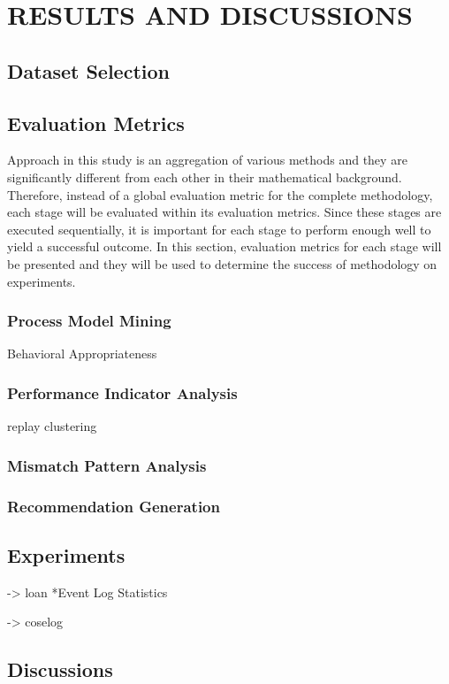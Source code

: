 \chapter{RESULTS AND DISCUSSIONS}
\label{chp:results-and-discussions}
 

\section{Dataset Selection}
\label{sec:dataset-selection}
 

\section{Evaluation Metrics}
\label{sec:evaluation-metrics}
Approach in this study is an aggregation of various methods and they are significantly different from each other in their mathematical background. Therefore, instead of a global evaluation metric for the complete methodology, each stage will be evaluated within its evaluation metrics. Since these stages are executed sequentially, it is important for each stage to perform enough well to yield a successful outcome. In this section, evaluation metrics for each stage will be presented and they will be used to determine the success of methodology on experiments.

\subsection{Process Model Mining}
\label{subsec:process-model-mining-eval}
Behavioral Appropriateness

\subsection{Performance Indicator Analysis}
\label{subsec:performance-indicator-analysis-eval}
		replay 
		clustering

\subsection{Mismatch Pattern Analysis}
\label{subsec:mismatch-pattern-analysis-eval}


\subsection{Recommendation Generation}
\label{subsec:recommendation-generation-eval}

\section{Experiments}
\label{sec:experiments}

-> loan
*Event Log Statistics

-> coselog

\section{Discussions}
\label{sec:discussions}